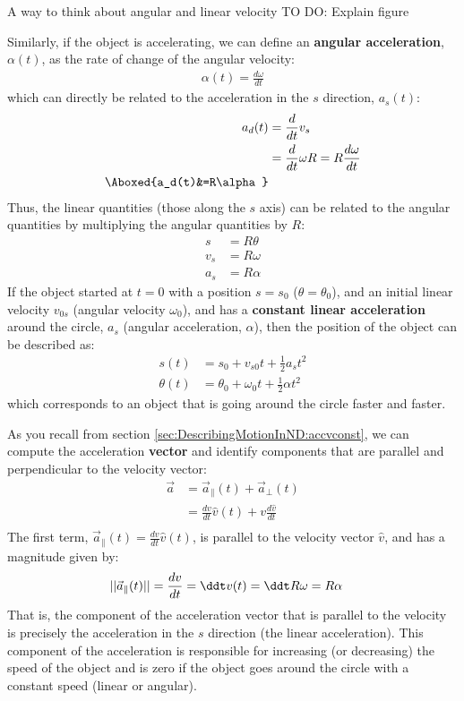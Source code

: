 \begin{studentopinionOW}{A way to think about angular and linear velocity}
TO DO: Explain figure
\end{studentopinionOW}

Similarly, if the object is accelerating, we can define an \textbf{angular acceleration}, $\alpha(t)$, as the rate of change of the angular velocity:
\begin{align*}
\alpha(t)=\frac{d\omega}{dt}
\end{align*}
which can directly be related to the acceleration in the $s$ direction, $a_s(t)$:
\begin{align*}
a_d(t) &= \frac{d}{dt}v_s\\
&=\frac{d}{dt}\omega R=R\frac{d\omega}{dt}\\
\Aboxed{a_d(t)&=R\alpha }
\end{align*}
Thus, the linear quantities (those along the $s$ axis) can be related to the angular quantities by multiplying the angular quantities by $R$:
\begin{align}
s&=R\theta\\
v_s&=R\omega\\
a_s&=R\alpha
\end{align}
If the object started at $t=0$ with a position $s=s_0$ ($\theta=\theta_0$), and an initial linear velocity $v_{0s}$ (angular velocity $\omega_0$), and has a \textbf{constant linear acceleration} around the circle, $a_s$ (angular acceleration, $\alpha$), then the position of the object can be described as:
\begin{align*}
s(t) &= s_0+v_{s0}t+\frac{1}{2}a_s t^2\\
\theta(t) &= \theta_0+\omega_0t+\frac{1}{2}\alpha t^2
\end{align*}
which corresponds to an object that is going around the circle faster and faster.

As you recall from section \ref{sec:DescribingMotionInND:accvconst}, we can compute the acceleration \textbf{vector} and identify components that are parallel and perpendicular to the velocity vector:
\begin{align*}
\vec a&=\vec a_{\parallel}(t) + \vec a_{\bot}(t)\\
&=\frac{dv}{dt}\hat v(t)+v\frac{d\hat v}{dt}\\
\end{align*}
The first term, $\vec a_{\parallel}(t)=\frac{dv}{dt}\hat v(t)$, is parallel to the velocity vector $\hat v$, and has a magnitude given by:
\begin{align*}
||\vec a_{\parallel}(t)||&=\frac{dv}{dt}=\ddt v(t)=\ddt R\omega=R\alpha
\end{align*}
That is, the component of the acceleration vector that is parallel to the velocity is precisely the acceleration in the $s$ direction (the linear acceleration). This component of the acceleration is responsible for increasing (or decreasing) the speed of the object and is zero if the object goes around the circle with a constant speed (linear or angular). 

